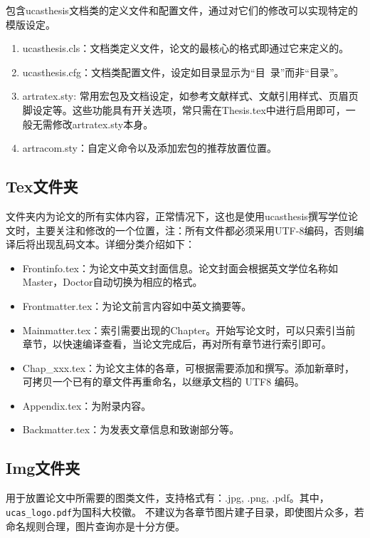 包含ucasthesis文档类的定义文件和配置文件，通过对它们的修改可以实现特定的模版设定。

\begin{enumerate}
    \item ucasthesis.cls：文档类定义文件，论文的最核心的格式即通过它来定义的。
    \item ucasthesis.cfg：文档类配置文件，设定如目录显示为“目~录”而非“目录”。
    \item artratex.sty: 常用宏包及文档设定，如参考文献样式、文献引用样式、页眉页脚设定等。这些功能具有开关选项，常只需在Thesis.tex中进行启用即可，一般无需修改artratex.sty本身。
    \item artracom.sty：自定义命令以及添加宏包的推荐放置位置。
\end{enumerate}

\subsection{Tex文件夹}

文件夹内为论文的所有实体内容，正常情况下，这也是使用ucasthesis撰写学位论文时，主要关注和修改的一个位置，注：所有文件都必须采用UTF-8编码，否则编译后将出现乱码文本。详细分类介绍如下：

\begin{itemize}
    \item Frontinfo.tex：为论文中英文封面信息。论文封面会根据英文学位名称如Master，Doctor自动切换为相应的格式。
    \item Frontmatter.tex：为论文前言内容如中英文摘要等。
    \item Mainmatter.tex：索引需要出现的Chapter。开始写论文时，可以只索引当前章节，以快速编译查看，当论文完成后，再对所有章节进行索引即可。
    \item Chap{\_}xxx.tex：为论文主体的各章，可根据需要添加和撰写。添加新章时，可拷贝一个已有的章文件再重命名，以继承文档的 UTF8 编码。
    \item Appendix.tex：为附录内容。
    \item Backmatter.tex：为发表文章信息和致谢部分等。
\end{itemize}

\subsection{Img文件夹}

用于放置论文中所需要的图类文件，支持格式有：.jpg, .png, .pdf。其中，\verb|ucas_logo.pdf|为国科大校徽。
不建议为各章节图片建子目录，即使图片众多，若命名规则合理，图片查询亦是十分方便。


